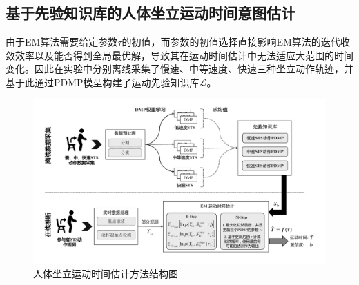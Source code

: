 \subsection{基于先验知识库的人体坐立运动时间意图估计}
由于EM算法需要给定参数$\tau$的初值，而参数的初值选择直接影响EM算法的迭代收敛效率以及能否得到全局最优解，导致其在运动时间估计中无法适应大范围的时间变化。因此在实验中分别离线采集了慢速、中等速度、快速三种坐立动作轨迹，并基于此通过PDMP模型构建了运动先验知识库$\mathscr{L}$。

\begin{figure}[htb]
    \centering\includegraphics[width=1\textwidth]{figures/4-Fig-3.pdf}
    \caption{人体坐立运动时间估计方法结构图}
    \label{fig:4-3}
\end{figure}

